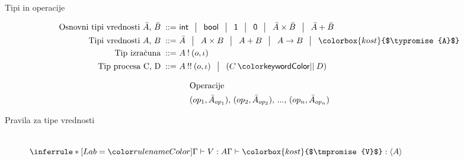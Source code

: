 \documentclass{beamer}
\theoremstyle{definition} %
\theoremstyle{plain} %
\begin{document}
	\begin{frame}{Tipi in operacije}
		\begin{figure}[tb]
			\parbox{\textwidth}{
				\centering
				\tiny
				\begin{align*}
				\text{Osnovni tipi vrednosti $\bar{A}$, $\bar{B}$}
				\bnfis & \tysym{int} \,\bnfor\! \tysym{bool} \,\bnfor\! \tyunit \,\bnfor\! \tyempty \, 
				          \bnfor\! \typrod{\bar{A}}{\bar{B}} \,\bnfor\! \tysum{\bar{A}}{\bar{B}}
				\\
				\text{Tipi vrednosti $A$, $B$}
				\bnfis & \bar{A} \, \bnfor\! \typrod{A}{B} \,\bnfor\! \tysum{A}{B} \,\bnfor\! \tyfun{A}{B} \,\bnfor\! \colorbox{kost}{$\typromise{A}$}
				\\
				\text{Tip izračuna} \bnfis& \tycomp{A}{\o,\i}
				\\
				\text{Tip procesa \tyC, \tyD}  \bnfis & \tyrun{A}{\o,\i} \,\bnfor\! \typar{\tyC}{\tyD}
				\end{align*}
			} 
		\end{figure}
	
		\begin{figure}
			\centering
			\tiny
			\begin{align*}
			\intertext{Operacije}
			(op_1, \bar{A}_{op_1}),\, (op_2, \bar{A}_{op_2}),\, ... ,\, (op_n, \bar{A}_{op_n})
			\end{align*}
			\vspace{-15ex}
		\end{figure}
	\end{frame}

	\begin{frame}{Pravila za tipe vrednosti}
		\begin{figure}[tp]
			\centering
			\tiny
			\begin{mathpar}
				\qquad
				\qquad
				\quad
				\quad
				\coopinfer{}{
				}{
					\Gamma \types \tmunit : \tyunit
				}
				\\
				\quad
				\colorbox{kost}{$\coopinfer{}{
					\Gamma \types V : A
				}{
					\Gamma \types \colorbox{kost}{$\tmpromise{V}$} : \typromise A
				}$}
				\quad
				\quad
				\\
				\quad
			\end{mathpar}
		\end{figure}
	\end{frame}
\end{document}
